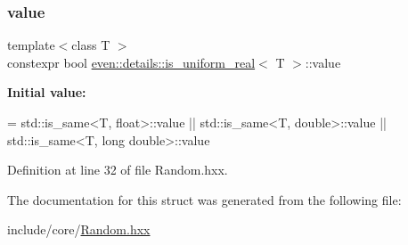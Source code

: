 \subsubsection{\texorpdfstring{value}{value}}
{\footnotesize\ttfamily template$<$class T $>$ \\
constexpr bool \mbox{\hyperlink{structeven_1_1details_1_1is__uniform__real}{even\+::details\+::is\+\_\+uniform\+\_\+real}}$<$ T $>$\+::value\hspace{0.3cm}{\ttfamily [static]}}

{\bfseries Initial value\+:}
\begin{DoxyCode}
=
                std::is\_same<T,       float>::value ||
        std::is\_same<T, double>::value ||
        std::is\_same<T, long double>::value
\end{DoxyCode}


Definition at line 32 of file Random.\+hxx.



The documentation for this struct was generated from the following file\+:\begin{DoxyCompactItemize}
\item 
include/core/\mbox{\hyperlink{_random_8hxx}{Random.\+hxx}}\end{DoxyCompactItemize}
